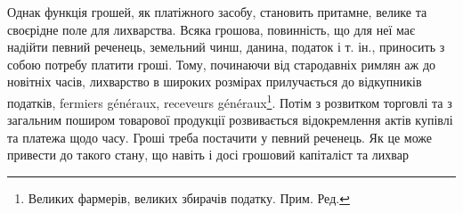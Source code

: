 Однак функція грошей, як платіжного засобу, становить притамне, велике
та своєрідне поле для лихварства. Всяка грошова, повинність, що для неї має
надійти певний реченець, земельний чинш, данина, податок і т. ін., приносить
з собою потребу платити гроші. Тому, починаючи від стародавніх римлян аж
до новітніх часів, лихварство в широких розмірах прилучається до відкупників
податків, fermiers généraux, receveurs généraux\footnote*{
Великих фармерів, великих збирачів податку. Прим. Ред.
}. Потім з розвитком торговлі та
з загальним поширом товарової продукції розвивається відокремлення актів купівлі
та платежа щодо часу. Гроші треба постачити у певний реченець. Як це може
привести до такого стану, що навіть і досі грошовий капіталіст та лихвар